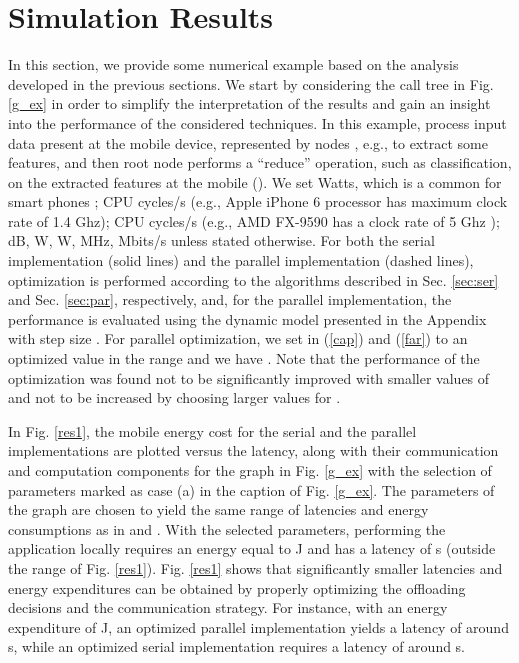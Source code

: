 \documentclass[journal,twocolumn,10pt,twoside]{IEEEtranTCOM}
\theoremstyle{plain}
\theoremstyle{plain}
\theoremstyle{remark}
\begin{document}
\section{Simulation Results}
\label{sec:simu}
\label{sec:sim}
In this section, we provide some numerical example based on the analysis developed in the previous sections. We start by considering the call tree in Fig. \ref{g_ex} in order to simplify the interpretation of the results and gain an insight into the performance of the considered techniques. In this example,  process input data present at the mobile device, represented by nodes , e.g., to extract some features, and then root node  performs a ``reduce'' operation, such as classification, on the extracted features at the mobile (). We set   Watts, which is a common for smart phones \cite{no,cpu_url,cpu_url2};  CPU cycles/s (e.g., Apple iPhone 6 processor has maximum clock rate of 1.4 Ghz);  CPU cycles/s (e.g., AMD FX-9590 has a clock rate of 5 Ghz \cite{amd});  dB,  W,  W,  MHz,   Mbits/s unless stated otherwise. For both the serial implementation (solid lines) and the parallel implementation (dashed lines), optimization is performed according to the algorithms described in Sec. \ref{sec:ser} and Sec. \ref{sec:par}, respectively, and, for the parallel implementation, the performance is evaluated using the dynamic model presented in the Appendix with step size . For parallel optimization, we set  in (\ref{cap}) and (\ref{far}) to an optimized value in the range  and we have . Note that the performance of the optimization was found not to be significantly improved with smaller values of  and not to be increased by choosing larger values for .

In Fig. \ref{res1}, the mobile energy cost for the serial and the parallel implementations are plotted versus the latency, along with their communication and computation components for the graph in Fig. \ref{g_ex} with the selection of parameters marked as case (a) in the caption of Fig. \ref{g_ex}. The parameters of the graph are chosen to yield the same range of latencies and energy consumptions as in \cite{maui} and \cite{hermp}. With the selected parameters, performing the application locally requires an energy equal to  J and has a latency of  s (outside the range of Fig. \ref{res1}). Fig. \ref{res1} shows that significantly smaller latencies and energy expenditures can be obtained by properly optimizing the offloading decisions and the communication strategy. For instance, with an energy expenditure of  J, an optimized parallel implementation yields a latency of around  s, while an optimized serial implementation requires a latency of around  s.
\end{document}
